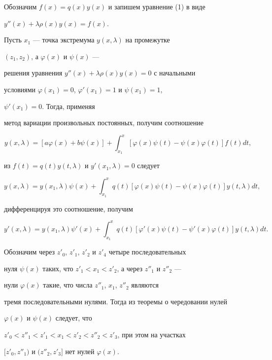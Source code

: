 \begin{pf} 


Обозначим $f(x)=q(x)y(x)$ и запишем уравнение (1) в виде 


$y''(x)+\lambda\rho(x)y(x)=f(x)$. 


Пусть $x_1$ --- точка экстремума $y(x,\lambda)$ на промежутке 


$(z_1,z_2)$, а $\varphi(x)$ и $\psi(x)$ --- 


решения уравнения $y''(x)+\lambda\rho(x)y(x)=0$ с начальными 


условиями $\varphi(x_1)=0$, $\varphi'(x_1)=1$ и $\psi(x_1)=1$, 


$\psi'(x_1)=0$. Тогда, применяя 


метод вариации произвольных постоянных, получим соотношение 


$$ 


y(x,\lambda)=[a\varphi(x)+b\psi(x)]+\int^x_{x_1} 


[\varphi(x)\psi(t)-\psi(x)\varphi(t)]f(t)dt,


$$ 


из $f(t)=q(t)y(t,\lambda)$ и $y'(x_1,\lambda)=0$ следует


$$ 


y(x,\lambda)=y(x_1,\lambda)\psi(x)+\int^x_{x_1}q(t) 


[\varphi(x)\psi(t)-\psi(x)\varphi(t)]y(t,\lambda)dt,


$$ 


дифференцируя это соотношение, получим 


$$ 


y'(x,\lambda)=y(x_1,\lambda)\psi'(x)+\int^x_{x_1}q(t) 


[\varphi'(x)\psi(t)-\psi'(x)\varphi(t)]y(t,\lambda)dt. 


$$ 


Обозначим через $z'_0$, $z'_1$, $z'_2$ и $z'_4$ четыре последовательных 


нуля $\psi(x)$ таких, что $z'_1<x_1<z'_2$, а через $z''_1$ и $z''_2$ --- 


нули $\varphi(x)$ такие, что числа $z''_1$, $x_1$, $z''_2$ являются 


тремя последовательными нулями. Тогда из теоремы о чередовании нулей 


$\varphi(x)$ и $\psi(x)$ следует, что 


$z'_0< z''_1< z'_1< x_1< z'_2< z''_2< z'_3$, при этом на участках 


$[z'_0,z''_1)$ и $(z''_2,z'_3]$ нет нулей $\varphi(x)$. 



\end{pf}
